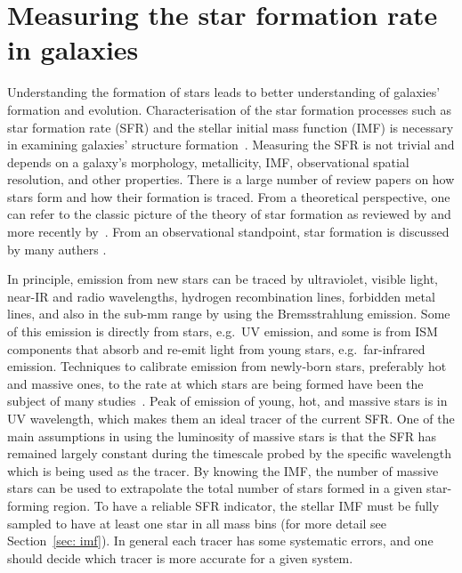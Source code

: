
\section{Measuring the star formation rate in galaxies} 
\label{sec: sfr_intro}
Understanding the formation of stars leads to better understanding of galaxies' formation and evolution. 
Characterisation of the star formation processes such as star formation rate (SFR) and the stellar initial mass function (IMF) is necessary in examining galaxies' structure formation~\citep{McKee07}. 
Measuring the SFR is not trivial and depends on a galaxy's morphology, metallicity, IMF, observational spatial resolution, and other properties. 
There is a large number of review papers on how stars form and how their formation is traced. 
From a theoretical perspective, one can refer to the classic picture of the theory of star formation as reviewed by \cite{Shu87} and more recently by~\cite{McKee07}. 
From an observational standpoint, star formation is discussed by many authers \citep[e.g.][and references therein]{Kennicutt98b, Kewley02, Calzetti13, Boquien10, Kennicutt12}.

In principle, emission from new stars can be traced by ultraviolet, visible light, near-IR and radio wavelengths, hydrogen recombination lines, forbidden metal lines, and also in the sub-mm range by using the Bremsstrahlung emission. 
Some of this emission is directly from stars, e.g.\ UV emission, and some is from ISM components that absorb and re-emit light from young stars, e.g.\ far-infrared emission.
Techniques to calibrate emission from newly-born stars, preferably hot and massive ones, to the rate at which stars are being formed have been the subject of many studies~\citep[e.g.][]{Calzetti07, Kennicutt11, Hao11,Bigiel08}. 
Peak of emission of young, hot, and massive stars is in UV wavelength, which makes them an ideal tracer of the current SFR.
One of the main assumptions in using the luminosity of massive stars is that the SFR has remained largely constant during the timescale probed by the specific wavelength which is being used as the tracer. 
By knowing the IMF, the number of massive stars can be used to extrapolate the total number of stars formed in a given star-forming region.
To have a reliable SFR indicator, the stellar IMF must be fully sampled to have at least one star in all mass bins (for more detail see Section~\ref{sec: imf}).
In general each tracer has some systematic errors, and one should decide which tracer is more accurate for a given system. 

